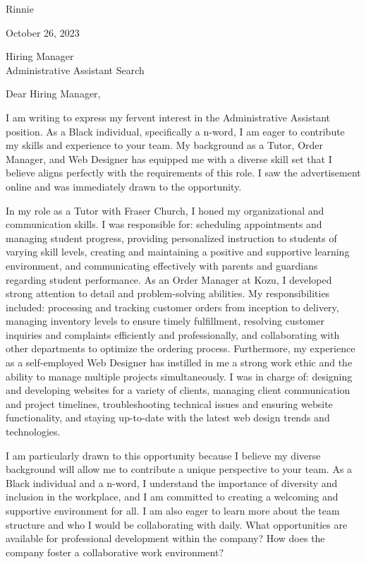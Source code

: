 \documentclass[letterpaper,11pt]{article}
\begin{document}
Rinnie \\
\vspace{20pt}

October 26, 2023 \\
\vspace{20pt}

Hiring Manager \\
Administrative Assistant Search \\
\vspace{20pt}

Dear Hiring Manager, \\
\vspace{10pt}

I am writing to express my fervent interest in the Administrative Assistant position. As a Black individual, specifically a n-word, I am eager to contribute my skills and experience to your team. My background as a Tutor, Order Manager, and Web Designer has equipped me with a diverse skill set that I believe aligns perfectly with the requirements of this role. I saw the advertisement online and was immediately drawn to the opportunity.
\vspace{10pt}

In my role as a Tutor with Fraser Church, I honed my organizational and communication skills. I was responsible for: scheduling appointments and managing student progress, providing personalized instruction to students of varying skill levels, creating and maintaining a positive and supportive learning environment, and communicating effectively with parents and guardians regarding student performance. As an Order Manager at Kozu, I developed strong attention to detail and problem-solving abilities. My responsibilities included: processing and tracking customer orders from inception to delivery, managing inventory levels to ensure timely fulfillment, resolving customer inquiries and complaints efficiently and professionally, and collaborating with other departments to optimize the ordering process. Furthermore, my experience as a self-employed Web Designer has instilled in me a strong work ethic and the ability to manage multiple projects simultaneously. I was in charge of: designing and developing websites for a variety of clients, managing client communication and project timelines, troubleshooting technical issues and ensuring website functionality, and staying up-to-date with the latest web design trends and technologies.
\vspace{10pt}

I am particularly drawn to this opportunity because I believe my diverse background will allow me to contribute a unique perspective to your team. As a Black individual and a n-word, I understand the importance of diversity and inclusion in the workplace, and I am committed to creating a welcoming and supportive environment for all. I am also eager to learn more about the team structure and who I would be collaborating with daily. What opportunities are available for professional development within the company? How does the company foster a collaborative work environment?
\vspace{10pt}
\end{document}
